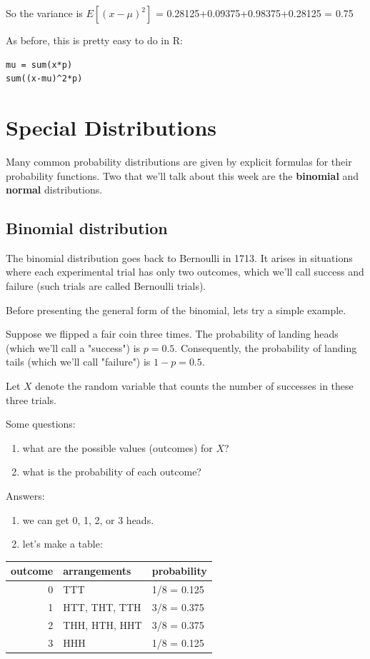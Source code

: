 \documentclass[11pt]{article}
\begin{document}
So the variance is $E[(x-\mu)^2]$ = 0.28125+0.09375+0.98375+0.28125 = 0.75

As before, this is pretty easy to do in R:

\begin{verbatim}
mu = sum(x*p)
sum((x-mu)^2*p)
\end{verbatim}

\section*{Special Distributions}
\label{sec-2}
Many common probability distributions are given by explicit formulas for their probability functions.  Two that we'll talk about this week are the \textbf{binomial} and \textbf{normal} distributions.
\subsection*{Binomial distribution}
\label{sec-2-1}

The binomial distribution goes back to Bernoulli in 1713.  It arises in situations where each experimental trial has only two outcomes, which we'll call success and failure (such trials are called Bernoulli trials).  

Before presenting the general form of the binomial, lets try a simple example.

Suppose we flipped a fair coin three times.  The probability of landing heads (which we'll call a "success") is $p=0.5$.  Consequently, the probability of landing tails (which we'll call "failure") is $1-p=0.5$.

Let $X$ denote the random variable that counts the number of successes in these three trials.

Some questions:
\begin{enumerate}
\item what are the possible values (outcomes) for $X$?
\item what is the probability of each outcome?
\end{enumerate}

Answers:
\begin{enumerate}
\item we can get 0, 1, 2, or 3 heads.
\item let's make a table:
\end{enumerate}

\begin{center}
\begin{tabular}{rll}
outcome & arrangements & probability\\
\hline
0 & TTT & 1/8 = 0.125\\
1 & HTT, THT, TTH & 3/8 = 0.375\\
2 & THH, HTH, HHT & 3/8 = 0.375\\
3 & HHH & 1/8 = 0.125\\
\end{tabular}
\end{center}
\end{document}
